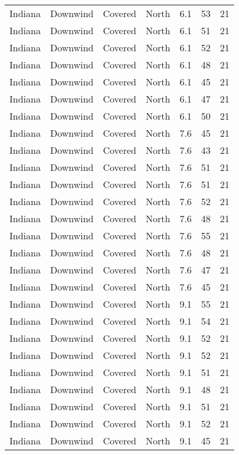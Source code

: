 \documentclass{article}
\begin{document}
\begin{longtable}[H]{ccccccc}
Indiana & Downwind & Covered     & North  & 6.1  & 53 & 21 \\
Indiana & Downwind & Covered     & North  & 6.1  & 51 & 21 \\
Indiana & Downwind & Covered     & North  & 6.1  & 52 & 21 \\
Indiana & Downwind & Covered     & North  & 6.1  & 48 & 21 \\
Indiana & Downwind & Covered     & North  & 6.1  & 45 & 21 \\
Indiana & Downwind & Covered     & North  & 6.1  & 47 & 21 \\
Indiana & Downwind & Covered     & North  & 6.1  & 50 & 21 \\
Indiana & Downwind & Covered     & North  & 7.6  & 45 & 21 \\
Indiana & Downwind & Covered     & North  & 7.6  & 43 & 21 \\
Indiana & Downwind & Covered     & North  & 7.6  & 51 & 21 \\
Indiana & Downwind & Covered     & North  & 7.6  & 51 & 21 \\
Indiana & Downwind & Covered     & North  & 7.6  & 52 & 21 \\
Indiana & Downwind & Covered     & North  & 7.6  & 48 & 21 \\
Indiana & Downwind & Covered     & North  & 7.6  & 55 & 21 \\
Indiana & Downwind & Covered     & North  & 7.6  & 48 & 21 \\
Indiana & Downwind & Covered     & North  & 7.6  & 47 & 21 \\
Indiana & Downwind & Covered     & North  & 7.6  & 45 & 21 \\
Indiana & Downwind & Covered     & North  & 9.1  & 55 & 21 \\
Indiana & Downwind & Covered     & North  & 9.1  & 54 & 21 \\
Indiana & Downwind & Covered     & North  & 9.1  & 52 & 21 \\
Indiana & Downwind & Covered     & North  & 9.1  & 52 & 21 \\
Indiana & Downwind & Covered     & North  & 9.1  & 51 & 21 \\
Indiana & Downwind & Covered     & North  & 9.1  & 48 & 21 \\
Indiana & Downwind & Covered     & North  & 9.1  & 51 & 21 \\
Indiana & Downwind & Covered     & North  & 9.1  & 52 & 21 \\
Indiana & Downwind & Covered     & North  & 9.1  & 45 & 21 \\

\end{longtable}
\end{document}
